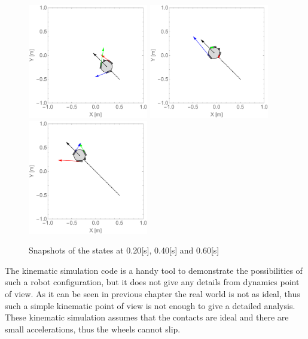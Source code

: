 \documentclass[12pt,english,twoside]{article}
\begin{document}
\begin{figure}[htb!]
	\centering
	\includegraphics[height=5cm]{figures/2d_simulation/animations2/2D_move_along_line_and_rotating/20}
	\endminipage\hfill
	\centering
	\includegraphics[height=5cm]{figures/2d_simulation/animations2/2D_move_along_line_and_rotating/40}
	\endminipage\hfill
	\centering
	\includegraphics[height=5cm]{figures/2d_simulation/animations2/2D_move_along_line_and_rotating/60}
	\endminipage\hfill
	\caption{Snapshots of the states at 0.20[s], 0.40[s] and 0.60[s]}
\end{figure}
The kinematic simulation code is a handy tool to demonstrate the possibilities of such a robot configuration, but it does not give any details from dynamics point of view. As it can be seen in previous chapter the real world is not as ideal, thus such a simple kinematic point of view is not enough to give a detailed analysis. These kinematic simulation assumes that the contacts are ideal and there are small accelerations, thus the wheels cannot slip.
\newpage
\end{document}
